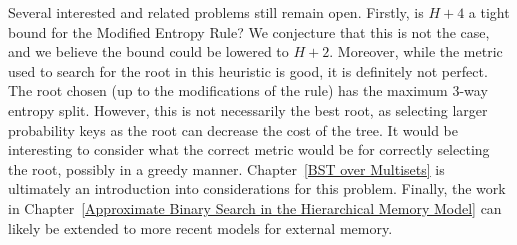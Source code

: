 \documentclass[letterpaper,12pt,titlepage,oneside,final]{book}
\theoremstyle{plain}
\let\origdoublepage\cleardoublepage
\newcommand{\clearemptydoublepage}{%
  \clearpage{\pagestyle{empty}\origdoublepage}}
\let\cleardoublepage\clearemptydoublepage
\begin{document}
Several interested and related problems still remain open. Firstly, is $H+4$ a tight bound for the Modified Entropy Rule? We conjecture that this is not the case, and we believe the bound could be lowered to $H+2$. Moreover, while the metric used to search for the root in this heuristic is good, it is definitely not perfect. The root chosen (up to the modifications of the rule) has the maximum 3-way entropy split. However, this is not necessarily the best root, as selecting larger probability keys as the root can decrease the cost of the tree. It would be interesting to consider what the correct metric would be for correctly selecting the root, possibly in a greedy manner. Chapter~\ref{BST over Multisets} is ultimately an introduction into considerations for this problem. 
Finally, the work in Chapter~\ref{Approximate Binary Search in the Hierarchical Memory Model} can likely be extended to more recent models for external memory. 








\cleardoublepage %
\renewcommand*{\bibname}{References}




\nocite{*}
\end{document}
